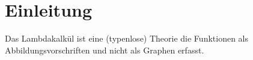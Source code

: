 \chapter{Einleitung}

Das Lambdakalkül ist eine (typenlose) Theorie die Funktionen als 
Abbildungsvorschriften und nicht als Graphen erfasst\autocite{Barendregt2012}.



